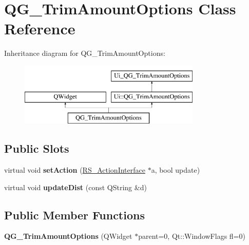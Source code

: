 \hypertarget{classQG__TrimAmountOptions}{\section{Q\-G\-\_\-\-Trim\-Amount\-Options Class Reference}
\label{classQG__TrimAmountOptions}
}
Inheritance diagram for Q\-G\-\_\-\-Trim\-Amount\-Options\-:\begin{figure}[H]
\begin{center}
\leavevmode
\includegraphics[height=3.000000cm]{classQG__TrimAmountOptions}
\end{center}
\end{figure}
\subsection*{Public Slots}
\begin{DoxyCompactItemize}
\item 
\hypertarget{classQG__TrimAmountOptions_ac126d7ec16c2945829106d30d6dedb4c}{virtual void {\bfseries set\-Action} (\hyperlink{classRS__ActionInterface}{R\-S\-\_\-\-Action\-Interface} $\ast$a, bool update)}\label{classQG__TrimAmountOptions_ac126d7ec16c2945829106d30d6dedb4c}

\item 
\hypertarget{classQG__TrimAmountOptions_a7ea265c43b57dd201ae243c36f34ec80}{virtual void {\bfseries update\-Dist} (const Q\-String \&d)}\label{classQG__TrimAmountOptions_a7ea265c43b57dd201ae243c36f34ec80}

\end{DoxyCompactItemize}
\subsection*{Public Member Functions}
\begin{DoxyCompactItemize}
\item 
\hypertarget{classQG__TrimAmountOptions_a167badc5bba6a7be66bdb6551bca213f}{{\bfseries Q\-G\-\_\-\-Trim\-Amount\-Options} (Q\-Widget $\ast$parent=0, Qt\-::\-Window\-Flags fl=0)}\label{classQG__TrimAmountOptions_a167badc5bba6a7be66bdb6551bca213f}

\end{DoxyCompactItemize}
